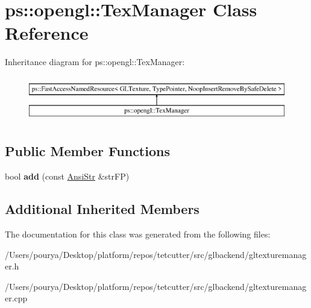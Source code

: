 \hypertarget{classps_1_1opengl_1_1TexManager}{}\section{ps\+:\+:opengl\+:\+:Tex\+Manager Class Reference}
\label{classps_1_1opengl_1_1TexManager}
Inheritance diagram for ps\+:\+:opengl\+:\+:Tex\+Manager\+:\begin{figure}[H]
\begin{center}
\leavevmode
\includegraphics[height=2.000000cm]{classps_1_1opengl_1_1TexManager}
\end{center}
\end{figure}
\subsection*{Public Member Functions}
\begin{DoxyCompactItemize}
\item 
\hypertarget{classps_1_1opengl_1_1TexManager_aadd48e37b3a865c93cf91a8add45aa35}{}bool {\bfseries add} (const \hyperlink{classps_1_1base_1_1CAString}{Ansi\+Str} \&str\+F\+P)\label{classps_1_1opengl_1_1TexManager_aadd48e37b3a865c93cf91a8add45aa35}

\end{DoxyCompactItemize}
\subsection*{Additional Inherited Members}


The documentation for this class was generated from the following files\+:\begin{DoxyCompactItemize}
\item 
/\+Users/pourya/\+Desktop/platform/repos/tetcutter/src/glbackend/gltexturemanager.\+h\item 
/\+Users/pourya/\+Desktop/platform/repos/tetcutter/src/glbackend/gltexturemanager.\+cpp\end{DoxyCompactItemize}
